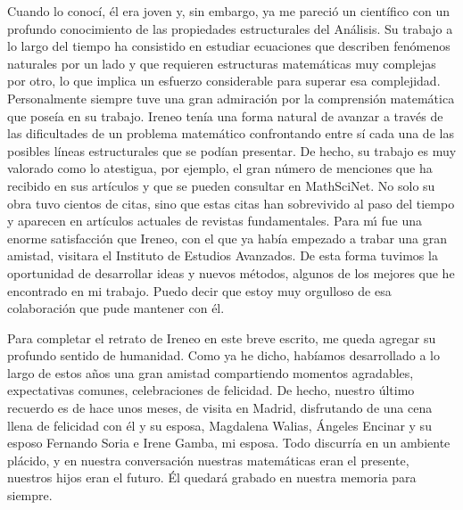 Cuando lo conoc\'i, \'el era joven y, sin embargo, ya me pareci\'o un cient\'ifico con un profundo conocimiento de las propiedades estructurales del An\'alisis. 
Su trabajo a lo largo del tiempo ha consistido en estudiar ecuaciones que describen fen\'omenos naturales por un lado y que requieren estructuras matem\'aticas muy complejas por otro, lo que implica un esfuerzo considerable para superar esa complejidad. Personalmente siempre tuve  una gran admiraci\'on por la comprensi\'on matem\'atica que pose\'ia en su trabajo.
Ireneo ten\'ia una forma natural de avanzar a trav\'es de las dificultades de un problema matem\'atico confrontando entre s\'i cada una de las posibles l\'ineas estructurales que se pod\'ian presentar. De hecho, su trabajo es muy valorado como lo atestigua, por ejemplo, el gran n\'umero de menciones que ha recibido en sus art\'iculos y que se pueden consultar en MathSciNet. 
No solo su obra tuvo cientos de citas, sino que estas citas han sobrevivido al paso del tiempo y aparecen en art\'iculos actuales de revistas fundamentales.
Para m\'{\i} fue una enorme satisfacci\'on que Ireneo, con el que ya hab\'ia empezado a trabar una gran amistad, visitara el Instituto de Estudios Avanzados. De esta forma tuvimos  la oportunidad de desarrollar  ideas y nuevos m\'etodos, algunos de los mejores  que  he encontrado en mi trabajo.
Puedo decir que estoy muy orgulloso de esa colaboraci\'on que pude mantener con \'el.



Para completar el retrato de Ireneo en este breve escrito, me queda agregar su profundo sentido de humanidad.
Como ya he dicho, hab\'iamos desarrollado a lo largo de estos a\~nos una gran amistad compartiendo momentos agradables, expectativas comunes, celebraciones de felicidad.
De hecho, nuestro \'ultimo recuerdo es de hace unos meses, de visita en Madrid, disfrutando de una cena llena de felicidad con \'el y su esposa, Magdalena Walias, \'Angeles Encinar y su esposo Fernando Soria e Irene Gamba, mi esposa.
Todo discurr\'ia en un ambiente pl\'acido, y en nuestra conversaci\'on nuestras matem\'aticas eran el presente, nuestros hijos eran el futuro.
\'El quedar\'a grabado en nuestra memoria para siempre.

%
%
%

\begin{center}
\resizebox{.5\linewidth}{!}{\color{azulsema}\rule{.5\linewidth}{1pt}
{\large $\diamond$} {\huge $\diamond$} {\large $\diamond$} \rule{.5\linewidth}{1pt}}
\end{center}
